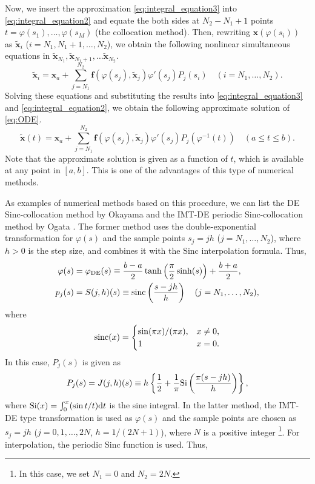 \documentclass[pdflatex,sn-mathphys-num]{sn-jnl}%
\theoremstyle{thmstyleone}%
\theoremstyle{thmstyletwo}%
\theoremstyle{thmstylethree}%
\begin{document}
Now, we insert the approximation \eqref{eq:integral_equation3} into \eqref{eq:integral_equation2} and equate the both sides at $N_2-N_1+1$ points $t=\varphi(s_1), \ldots, \varphi(s_M)$ (the collocation method). Then, rewriting ${\bm x}(\varphi(s_i))$ as $\widetilde{\bm x}_i$ ($i=N_1, N_1+1, \ldots, N_2$), we obtain the following nonlinear simultaneous equations in $\widetilde{\bm x}_{N_1}, \widetilde{\bm x}_{N_1+1}, \ldots \widetilde{\bm x}_{N_2}$.
\begin{equation}
\widetilde{\bm x}_i = {\bm x}_a + \sum_{j=N_1}^{N_2} {\bm f}(\varphi(s_j),\widetilde{\bm x}_j)\varphi'(s_j)P_j(s_i) \quad (i=N_1,\ldots,N_2).
\label{eq:nonlinear_equation}
\end{equation}
Solving these equations and substituting the results into \eqref{eq:integral_equation3} and \eqref{eq:integral_equation2}, we obtain the following approximate solution of \eqref{eq:ODE}.
\begin{equation}
\widetilde{\bm x}(t)={\bm x}_a+\sum_{j=N_1}^{N_2}{\bm f}(\varphi(s_j), \widetilde{\bm x}_j)\varphi'(s_j)P_j(\varphi^{-1}(t)) \quad (a\le t\le b).
\label{eq:solution}
\end{equation}
Note that the approximate solution is given as a function of $t$, which is available at any point in $[a,b]$. This is one of the advantages of this type of numerical methods.

As examples of numerical methods based on this procedure, we can list the DE Sinc-collocation method by Okayama \cite{Okayama18} and the IMT-DE periodic Sinc-collocation method by Ogata \cite{Ogata23}. The former method uses the double-exponential transformation for $\varphi(s)$ and the sample points $s_j=jh$ ($j=N_{1},\ldots,N_{2}$), where $h > 0$ is the step size, and combines it with the Sinc interpolation formula. Thus,
\begin{align}
\varphi(s) &= \varphi_{\rm DE}(s) \equiv \frac{b-a}{2}\tanh\left(\frac{\pi}{2}\sinh(s)\right)+\frac{b+a}{2}, \label{eq:DE} \\
p_j(s) &= S(j,h)(s) \equiv {\rm sinc}\left(\frac{s-jh}{h}\right)\quad (j=N_{1},\ldots,N_{2}), \label{eq:sinc}
\end{align}
where
\begin{equation}
{\rm sinc}(x)=\begin{cases}
\sin(\pi x)/(\pi x), & x\ne 0, \\
1 & x=0.
\end{cases}
\end{equation}
In this case, $P_j(s)$ is given as
\begin{equation}
P_j(s) = J(j,h)(s) \equiv h\left\{\frac{1}{2}+\frac{1}{\pi}{\rm Si}\left(\frac{\pi(s-jh)}{h}\right)\right\}, \label{eq:Pjs}
\end{equation}
where ${\rm Si}(x)=\int_0^x(\sin t/t){\rm d}t$ is the sine integral. In the latter method, the IMT-DE type transformation is used as $\varphi(s)$ and the sample points are chosen as $s_j=jh$ ($j=0, 1, \ldots, 2N$, $h=1/(2N+1)$), 
where $N$ is a positive integer%
\footnote{In this case, we set $N_{1} = 0$ and $N_{2} = 2N$.}. 
For interpolation, the periodic Sinc function is used. Thus,
\end{document}
